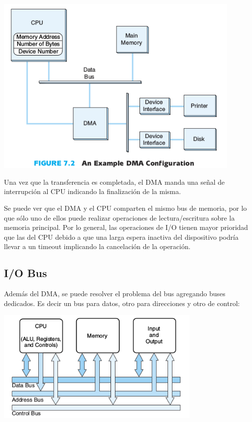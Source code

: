 \begin{center}
	\includegraphics[width=12cm, keepaspectratio=yes]{imagenes/iodma.png}
\end{center}

Una vez que la transferencia es completada, el DMA manda una señal de interrupción al CPU indicando la finalización de la misma. 

Se puede ver que el DMA y el CPU comparten el mismo bus de memoria, por lo que sólo uno de ellos puede realizar operaciones de lectura/escritura sobre la memoria principal. Por lo general, las operaciones de I/O tienen mayor prioridad que las del CPU debido a que una larga espera inactiva del dispositivo podría llevar a un timeout implicando la cancelación de la operación.

\subsection{I/O Bus}
Además del DMA, se puede resolver el problema del bus agregando buses dedicados. Es decir un bus para datos, otro para direcciones y otro de control:

\begin{center}
	\includegraphics[width=10cm, keepaspectratio=yes]{imagenes/iobuses.png}
\end{center}

